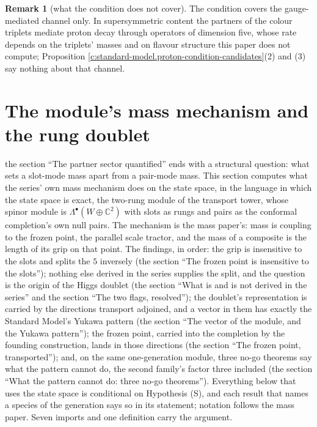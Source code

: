 \documentclass[11pt]{article}
\theoremstyle{definition}
\newtheorem{remark}[theorem]{Remark}
\theoremstyle{plain}
\providecommand{\C}{}\renewcommand{\C}{\mathbb{C}}
\begin{document}
\begin{remark}[what the condition does not cover]\label{c:note.standard-model.what-condition-does-not-cover}
The condition covers the gauge-mediated channel only. In supersymmetric content the partners of the colour triplets mediate proton decay through operators of dimension five, whose rate depends on the triplets' masses and on flavour structure this paper does not compute; Proposition \ref{c:standard-model.proton-condition-candidates}(2) and (3) say nothing about that channel.
\end{remark}

\section{The module's mass mechanism and the rung doublet}

\label{c:note.standard-model.setting-modules-mass-mechanism-rung-doublet}
the section ``The partner sector quantified'' ends with a structural question: what sets a slot-mode mass apart from a pair-mode mass. This section computes what the series' own mass mechanism does on the state space, in the language in which the state space is exact, the two-rung module of the transport tower, whose spinor module is $\Lambda^{\bullet}(W \oplus \C^{2})$ with slots as rungs and pairs as the conformal completion's own null pairs. The mechanism is the mass paper's: mass is coupling to the frozen point, the parallel scale tractor, and the mass of a composite is the length of its grip on that point. The findings, in order: the grip is insensitive to the slots and splits the $5$ inversely (the section ``The frozen point is insensitive to the slots''); nothing else derived in the series supplies the split, and the question is the origin of the Higgs doublet (the section ``What is and is not derived in the series'' and the section ``The two flags, resolved''); the doublet's representation is carried by the directions transport adjoined, and a vector in them has exactly the Standard Model's Yukawa pattern (the section ``The vector of the module, and the Yukawa pattern''); the frozen point, carried into the completion by the founding construction, lands in those directions (the section ``The frozen point, transported''); and, on the same one-generation module, three no-go theorems say what the pattern cannot do, the second family's factor three included (the section ``What the pattern cannot do: three no-go theorems''). Everything below that uses the state space is conditional on Hypothesis (S), and each result that names a species of the generation says so in its statement; notation follows the mass paper. Seven imports and one definition carry the argument.
\end{document}
